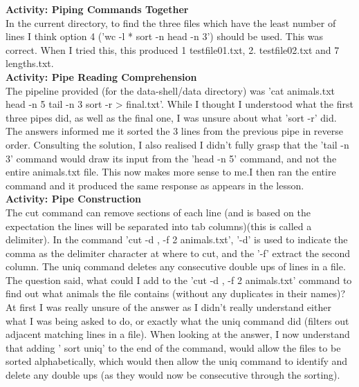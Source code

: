 \documentclass{article}
\begin{document}
\begin{FlushLeft}
\vspace{5mm}
\textbf{Activity: Piping Commands Together}\\
In the current directory, to find the three files which have the least number of lines I think option 4 ('wc -l * \textbar{} sort -n \textbar{} head -n 3') should be used. This was correct. When I tried this, this produced 1 testfile01.txt, 2. testfile02.txt and 7 lengths.txt.\\
\vspace{5mm}
\textbf{Activity: Pipe Reading Comprehension}\\
The pipeline provided (for the data-shell/data directory) was 'cat animals.txt \textbar{} head -n 5 \textbar{} tail -n 3 \textbar{} sort -r \textgreater{}  final.txt'. While I thought I understood what the first three pipes did, as well as the final one, I was unsure about what 'sort -r' did. The answers informed me it sorted the 3 lines from the previous pipe in reverse order. Consulting the solution, I also realised I didn't fully grasp that the 'tail -n 3' command would draw its input from the 'head -n 5' command, and not the entire animals.txt file. This now makes more sense to me.I then ran the entire command and it produced the same response as appears in the lesson.\\
\vspace{5mm}
\textbf{Activity: Pipe Construction}\\
The cut command can remove sections of each line (and is based on the expectation the lines will be separated into tab columns)(this is called a delimiter). In the command 'cut -d , -f 2 animals.txt', '-d' is used to indicate the comma as the delimiter character at where to cut, and the '-f' extract the second column. The uniq command deletes any consecutive double ups of lines in a file. The question said, what could I add to the 'cut -d , -f 2 animals.txt' command to find out what animals the file contains (without any duplicates in their names)? At first I was really unsure of the answer as I didn't really understand either what I was being asked to do, or exactly what the uniq command did (filters out adjacent matching lines in a file). When looking at the answer, I now understand that adding '\textbar{} sort \textbar{} uniq' to the end of the command, would allow the files to be sorted alphabetically, which would then allow the uniq command to identify and delete any double ups (as they would now be consecutive through the sorting). \\
\vspace{5mm}

\end{FlushLeft}
\end{document}
